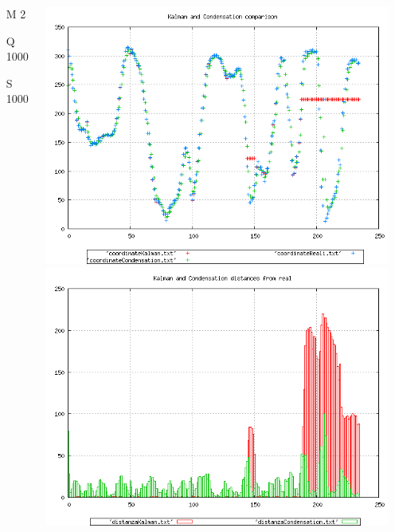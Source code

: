 {\begin{columns}
\begin{scriptsize}
\begin{itemize}
\item [M]2
\item [Q]1000
\item [S]1000
\end{itemize}
\end{scriptsize}
\includegraphics[scale=0.1]{../esperimenti/tappeto_nozoom/mod_2-Q_1000-S_1000/plot.png}\\
\includegraphics[scale=0.1]{../esperimenti/tappeto_nozoom/mod_2-Q_1000-S_1000/plot-distances.png}



\end{columns}}
